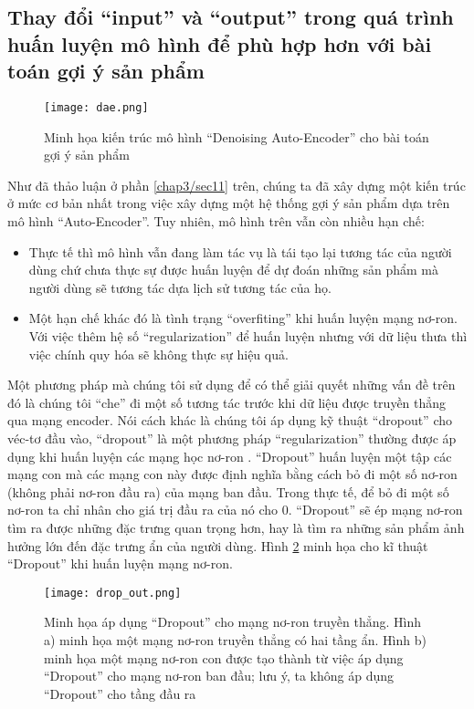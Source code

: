     \subsection{Thay đổi ``input'' và ``output'' trong quá trình huấn luyện mô hình để phù hợp hơn với bài toán gợi ý sản phẩm}
    \label{DAE_recsys}
    \begin{figure}
        \centering
        \texttt{[image: dae.png]}
        \caption{Minh họa kiến trúc mô hình ``Denoising Auto-Encoder'' cho bài toán gợi ý sản phẩm}
        \label{fig_recdae}
    \end{figure}

    Như đã thảo luận ở phần \ref{chap3/sec11} trên, chúng ta đã xây dựng một kiến trúc ở mức cơ bản nhất trong việc xây dựng một hệ thống gợi ý sản phẩm dựa trên mô hình ``Auto-Encoder''.
    Tuy nhiên, mô hình trên vẫn còn nhiều hạn chế: 
    \begin{itemize}
        \item Thực tế thì mô hình vẫn đang làm tác vụ là tái tạo lại tương tác của người dùng chứ chưa thực sự được huấn luyện để dự đoán những sản phẩm mà người dùng sẽ tương tác dựa lịch sử tương tác của họ.
        \item Một hạn chế khác đó là tình trạng ``overfiting'' khi huấn luyện mạng nơ-ron. Với việc thêm hệ số ``regularization'' để huấn luyện nhưng với dữ liệu thưa thì việc chính quy hóa sẽ không thực sự hiệu quả. 
    \end{itemize}

    Một phương pháp mà chúng tôi sử dụng để có thể giải quyết những vấn đề trên đó là chúng tôi ``che'' đi một số tương tác trước khi dữ liệu được truyền thẳng qua mạng encoder. 
    Nói cách khác là chúng tôi áp dụng kỹ thuật ``dropout'' cho véc-tơ đầu vào, ``dropout'' là một phương pháp ``regularization'' thường được áp dụng khi huấn luyện các mạng học nơ-ron \cite{Goodfellow-et-al-2016-Book}.
    ``Dropout'' huấn luyện một tập các mạng con mà các mạng con này được định nghĩa bằng cách bỏ đi một số nơ-ron (không phải nơ-ron đầu ra) của mạng ban đầu. 
    Trong thực tế, để bỏ đi một số nơ-ron ta chỉ nhân cho giá trị đầu ra của nó cho 0. 
    ``Dropout'' sẽ ép mạng nơ-ron tìm ra được những đặc trưng quan trọng hơn, hay là tìm ra những sản phẩm ảnh hưởng lớn đến đặc trưng ẩn của người dùng. 
    Hình \ref{fig_dropout} minh họa cho kĩ thuật ``Dropout'' khi huấn luyện mạng nơ-ron.
    \begin{figure}
        \centering
        \texttt{[image: drop\_out.png]}
        \caption[Minh họa áp dụng ``Dropout'' cho mạng nơ-ron truyền thẳng. ]{Minh họa áp dụng ``Dropout'' cho mạng nơ-ron truyền thẳng. Hình a) minh họa một mạng nơ-ron truyền thẳng có hai tầng ẩn. Hình b) minh họa một mạng nơ-ron con được tạo thành từ việc áp dụng “Dropout” cho mạng nơ-ron ban đầu; lưu ý, ta không áp dụng ``Dropout'' cho tầng đầu ra}
        \label{fig_dropout}
    \end{figure}

